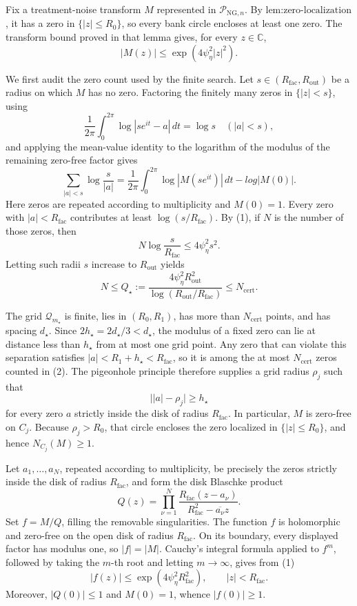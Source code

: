 Fix a treatment-noise transform \(M\) represented in \(\mathcal P_{\mathrm{NG},n}\).  By \(\text{lem:zero-localization}\), it has a zero in \(\{|z|\le R_0\}\), so every bank circle encloses at least one zero.  The transform bound proved in that lemma gives, for every \(z\in\mathbb C\),
\[
 |M(z)|\le \exp(4\psi_{\eta}^2|z|^2). \tag{1}
\]

We first audit the zero count used by the finite search.  Let \(s\in(R_{\mathrm{fac}},R_{\mathrm{out}})\) be a radius on which \(M\) has no zero.  Factoring the finitely many zeros in \(\{|z|<s\}\), using
\[
 \frac1{2\pi}\int_0^{2\pi}\log|se^{it}-a|\,dt=\log s
 \quad (|a|<s),
\]
and applying the mean-value identity to the logarithm of the modulus of the remaining zero-free factor gives
\[
 \sum_{|a|<s}\log\frac{s}{|a|}
 =\frac1{2\pi}\int_0^{2\pi}\log|M(se^{it})|\,dt-log|M(0)|.
\]
Here zeros are repeated according to multiplicity and \(M(0)=1\).  Every zero with \(|a|<R_{\mathrm{fac}}\) contributes at least \(\log(s/R_{\mathrm{fac}})\).  By (1), if \(N\) is the number of those zeros, then
\[
 N\log\frac{s}{R_{\mathrm{fac}}}
 \le4\psi_{\eta}^2s^2.
\]
Letting such radii \(s\) increase to \(R_{\mathrm{out}}\) yields
\[
 N\le
 Q_{\star}:=
 \frac{4\psi_{\eta}^2R_{\mathrm{out}}^2}
      {\log(R_{\mathrm{out}}/R_{\mathrm{fac}})}
 \le N_{\mathrm{cert}}. \tag{2}
\]

The grid \(\mathcal Q_{m_{\star}}\) is finite, lies in \((R_0,R_1)\), has more than \(N_{\mathrm{cert}}\) points, and has spacing \(d_{\star}\).  Since \(2h_{\star}=2d_{\star}/3<d_{\star}\), the modulus of a fixed zero can lie at distance less than \(h_{\star}\) from at most one grid point.  Any zero that can violate this separation satisfies \(|a|<R_1+h_{\star}<R_{\mathrm{fac}}\), so it is among the at most \(N_{\mathrm{cert}}\) zeros counted in (2).  The pigeonhole principle therefore supplies a grid radius \(\rho_j\) such that
\[
 \bigl||a|-\rho_j\bigr|\ge h_{\star} \tag{3}
\]
for every zero \(a\) strictly inside the disk of radius \(R_{\mathrm{fac}}\).  In particular, \(M\) is zero-free on \(C_j\).  Because \(\rho_j>R_0\), that circle encloses the zero localized in \(\{|z|\le R_0\}\), and hence \(N_{C_j}(M)\ge1\).

Let \(a_1,\ldots,a_N\), repeated according to multiplicity, be precisely the zeros strictly inside the disk of radius \(R_{\mathrm{fac}}\), and form the disk Blaschke product
\[
 Q(z)=\prod_{\nu=1}^N
 \frac{R_{\mathrm{fac}}(z-a_\nu)}
      {R_{\mathrm{fac}}^2-\overline{a_\nu}z}.
\]
Set \(f=M/Q\), filling the removable singularities.  The function \(f\) is holomorphic and zero-free on the open disk of radius \(R_{\mathrm{fac}}\).  On its boundary, every displayed factor has modulus one, so \(|f|=|M|\).  Cauchy's integral formula applied to \(f^m\), followed by taking the \(m\)-th root and letting \(m\to\infty\), gives from (1)
\[
 |f(z)|\le \exp(4\psi_{\eta}^2R_{\mathrm{fac}}^2),
 \qquad |z|<R_{\mathrm{fac}}. \tag{4}
\]
Moreover, \(|Q(0)|\le1\) and \(M(0)=1\), whence \(|f(0)|\ge1\).

